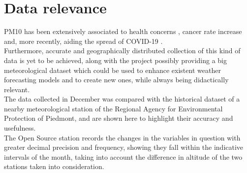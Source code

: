\documentclass[12pt, a4paper]{article}
\begin{document}
\section{Data relevance}
PM10 has been extensively associated to health concerns \cite{pm101996}, cancer rate increase \cite{pm10} and, more recently, aiding the spread of COVID-19 \cite{pmcovid}.\\
Furthermore, accurate and geographically distributed collection of this kind of data is yet to be achieved, along with the project possibly providing a big meteorological dataset which could be used to enhance existent weather forecasting models and to create new ones, while always being didactically relevant.\\

The data collected in December was compared with the historical dataset of a nearby meteorological station of the Regional Agency for Environmental Protection of Piedmont, and are shown here to highlight their accuracy and usefulness. \\
The Open Source station records the changes in the variables in question with greater decimal precision and frequency, showing they fall within the indicative intervals of the month, taking into account the difference in altitude of the two stations taken into consideration.
\end{document}
